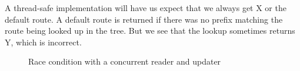 \documentclass[a4paper]{article}
\begin{document}
A thread-safe implementation will have us expect that we always get X or the default route. A default route is returned if there was no prefix matching the route being looked up in the tree. But we see that the lookup sometimes returns Y, which is incorrect.

\begin{figure}[tph]
\caption{Race condition with a concurrent reader and updater}
\label{race_readerfigure}
\end{figure}
\end{document}
